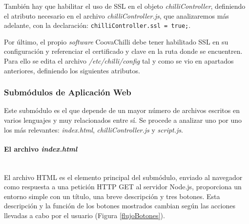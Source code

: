 También hay que habilitar el uso de SSL en el objeto \emph{chilliController}, definiendo el atributo necesario en el archivo \emph{chilliController.js}, que analizaremos más adelante, con la declaración: \texttt{chilliController.ssl = true;}.

Por último, el propio \emph{software} CoovaChilli debe tener habilitado SSL en su configuración y referenciar el certificado y clave en la ruta donde se encuentren. Para ello se edita el archivo \emph{/etc/chilli/config} tal y como se vio en apartados anteriores, definiendo los siguientes atributos.


\subsubsection{Submódulos de Aplicación Web} \label{webAppSubmodule}

Este submódulo es el que depende de un mayor número de archivos escritos en varios lenguajes y muy relacionados entre sí. Se procede a analizar uno por uno los más relevantes: \emph{index.html}, \emph{chilliController.js} y \emph{script.js}.

\paragraph{El archivo \emph{index.html}} \label{index.html} ~\\

El archivo HTML es el elemento principal del submódulo, enviado al navegador como respuesta a una petición HTTP GET al servidor Node.js, proporciona un entorno simple con un título, una breve descripción y tres botones. Esta descripción y la función de los botones mostrados cambian según las acciones llevadas a cabo por el usuario (Figura \ref{flujoBotones}).

